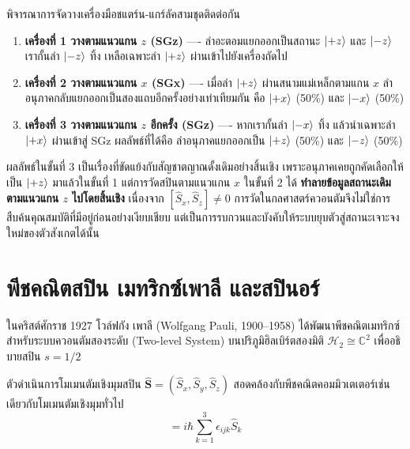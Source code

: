 พิจารณาการจัดวางเครื่องมือชแตร์น-แกร์ลัคสามชุดติดต่อกัน
\begin{enumerate}
    \item \textbf{เครื่องที่ 1 วางตามแนวแกน $z$ (SGz)} ---- ลำอะตอมแยกออกเป็นสถานะ $\ket{+z}$ และ $\ket{-z}$ เรากั้นลำ $\ket{-z}$ ทิ้ง เหลือเฉพาะลำ $\ket{+z}$ ผ่านเข้าไปยังเครื่องถัดไป
    \item \textbf{เครื่องที่ 2 วางตามแนวแกน $x$ (SGx)} ---- เมื่อลำ $\ket{+z}$ ผ่านสนามแม่เหล็กตามแกน $x$ ลำอนุภาคกลับแยกออกเป็นสองแถบอีกครั้งอย่างเท่าเทียมกัน คือ $\ket{+x}$ (50\%) และ $\ket{-x}$ (50\%)
    \item \textbf{เครื่องที่ 3 วางตามแนวแกน $z$ อีกครั้ง (SGz)} ---- หากเรากั้นลำ $\ket{-x}$ ทิ้ง แล้วนำเฉพาะลำ $\ket{+x}$ ผ่านเข้าสู่ SGz ผลลัพธ์ที่ได้คือ ลำอนุภาคแยกออกเป็น $\ket{+z}$ (50\%) และ $\ket{-z}$ (50\%)
\end{enumerate}

ผลลัพธ์ในขั้นที่ 3 เป็นเรื่องที่ขัดแย้งกับสัญชาตญาณดั้งเดิมอย่างสิ้นเชิง เพราะอนุภาคเคยถูกคัดเลือกให้เป็น $\ket{+z}$ มาแล้วในขั้นที่ 1 แต่การวัดสปินตามแนวแกน $x$ ในขั้นที่ 2 ได้ \textbf{ทำลายข้อมูลสถานะเดิมตามแนวแกน $z$ ไปโดยสิ้นเชิง} เนื่องจาก $[\hat{S}_x, \hat{S}_z] \neq 0$ การวัดในกลศาสตร์ควอนตัมจึงไม่ใช่การสืบค้นคุณสมบัติที่มีอยู่ก่อนอย่างเงียบเชียบ แต่เป็นการรบกวนและบังคับให้ระบบยุบตัวสู่สถานะเจาะจงใหม่ของตัวสังเกตได้นั้น

\section{พีชคณิตสปิน เมทริกซ์เพาลี และสปินอร์}

ในคริสต์ศักราช 1927 โวล์ฟกัง เพาลี (Wolfgang Pauli, 1900--1958) ได้พัฒนาพีชคณิตเมทริกซ์สำหรับระบบควอนตัมสองระดับ (Two-level System) บนปริภูมิฮิลเบิร์ตสองมิติ $\mathcal{H}_2 \cong \mathbb{C}^2$ เพื่ออธิบายสปิน $s = 1/2$

ตัวดำเนินการโมเมนตัมเชิงมุมสปิน $\hat{\mathbf{S}} = (\hat{S}_x, \hat{S}_y, \hat{S}_z)$ สอดคล้องกับพีชคณิตคอมมิวเตเตอร์เช่นเดียวกับโมเมนตัมเชิงมุมทั่วไป
\begin{equation}
[\hat{S}_i, \hat{S}_j] = i\hbar \sum_{k=1}^3 \epsilon_{ijk} \hat{S}_k
\label{eq:spin_commutation}
\end{equation}

